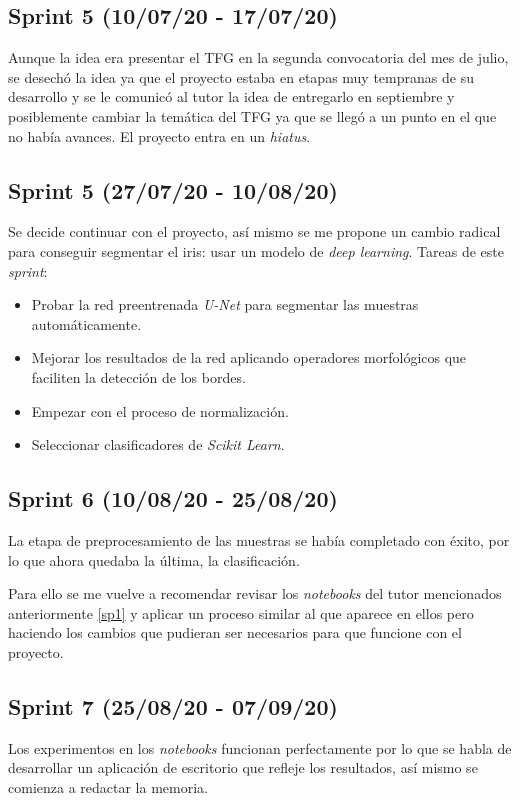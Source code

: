 \subsection{Sprint 5 (10/07/20 - 17/07/20)}
Aunque la idea era presentar el TFG en la segunda convocatoria del mes de julio, se desechó la idea ya que el proyecto estaba en etapas muy tempranas de su desarrollo y se le comunicó al tutor la idea de entregarlo en septiembre y posiblemente cambiar la temática del TFG ya que se llegó a un punto en el que no había avances. El proyecto entra en un \emph{hiatus}.
\subsection{Sprint 5 (27/07/20 - 10/08/20)}
Se decide continuar con el proyecto, así mismo se me propone un cambio radical para conseguir segmentar el iris: usar un modelo de \emph{deep learning}.
Tareas de este \emph{sprint}:
\begin{itemize}
    \item Probar la red preentrenada \emph{U-Net} para segmentar las muestras automáticamente.
    \item Mejorar los resultados de la red aplicando operadores morfológicos que faciliten la detección de los bordes.
    \item Empezar con el proceso de normalización.
    \item Seleccionar clasificadores de \emph{Scikit Learn}.
\end{itemize}

\subsection{Sprint 6 (10/08/20 - 25/08/20)}
La etapa de preprocesamiento de las muestras se había completado con éxito, por lo que ahora quedaba la última, la clasificación.

Para ello se me vuelve a recomendar revisar los \emph{notebooks} del tutor mencionados anteriormente \ref{sp1} y aplicar un proceso similar al que aparece en ellos pero haciendo los cambios que pudieran ser necesarios para que funcione con el proyecto.

\subsection{Sprint 7 (25/08/20 - 07/09/20)}
Los experimentos en los \emph{notebooks} funcionan perfectamente por lo que se habla de desarrollar un aplicación de escritorio que refleje los resultados, así mismo se comienza a redactar la memoria.

